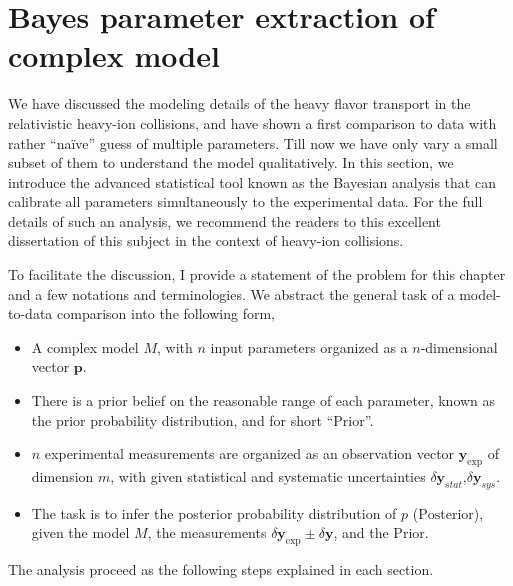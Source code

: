 \chapter{Bayes parameter extraction of complex model}
\label{chapter:bayes}
We have discussed the modeling details of the heavy flavor transport in the relativistic heavy-ion collisions, and have shown a first comparison to data with rather ``na\"ive'' guess of multiple parameters.
Till now we have only vary a small subset of them to understand the model qualitatively.
In this section, we introduce the advanced statistical tool known as the Bayesian analysis that can calibrate all parameters simultaneously to the experimental data.
For the full details of such an analysis, we recommend the readers to this excellent dissertation of this subject \cite{Bernhard:2018hnz} in the context of heavy-ion collisions.

To facilitate the discussion, I provide a statement of the problem for this chapter and a few notations and terminologies.
We abstract the general task of a model-to-data comparison into the following form,
\begin{itemize}
\item A complex model $M$, with $n$ input parameters organized as a $n$-dimensional vector $\mathbf{p}$.
\item There is a prior belief on the reasonable range of each parameter, known as the prior probability distribution, and for short ``$\mathrm{Prior}$''.
\item $n$ experimental measurements are organized as an observation vector $\mathbf{y}_{\exp}$ of dimension $m$, with given statistical and systematic uncertainties $\delta\mathbf{y}_{stat}$,$\delta\mathbf{y}_{sys}$.
\item The task is to infer the posterior probability distribution of $p$ ($\mathrm{Posterior}$), given the model $M$, the measurements $\delta\mathbf{y}_{\exp}\pm \delta \mathbf{y}$, and the $\mathrm{Prior}$.
\end{itemize}
The analysis proceed as the following steps explained in each section.

